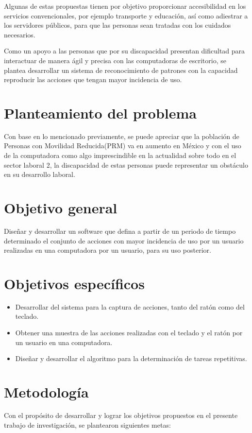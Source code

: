 
Algunas de estas propuestas tienen por objetivo proporcionar accesibilidad en
 los servicios convencionales, por ejemplo transporte y educación, así como
 adiestrar a los servidores públicos, para que las personas sean tratadas con
 los cuidados necesarios.
 
 
Como un apoyo a las personas que por su discapacidad presentan dificultad para
 interactuar de manera ágil y precisa con las computadoras de escritorio, se
 plantea desarrollar un sistema de reconocimiento de patrones con la capacidad
 reproducir las acciones que tengan mayor incidencia de uso.

\section{Planteamiento del problema}
Con base en lo mencionado previamente, se puede apreciar que la población de
 Personas con Movilidad Reducida(PRM) va en aumento en México y con el uso de
 la computadora como algo imprescindible en la actualidad sobre todo en el
 sector laboral 2, la discapacidad de estas personas puede representar un
 obstáculo en su desarrollo laboral.



\section{Objetivo general} 
Diseñar y desarrollar un software que defina a partir de un periodo de tiempo
 determinado el conjunto de acciones con mayor incidencia de uso por un usuario
 realizadas en una computadora por un usuario, para su uso posterior.

\section{Objetivos específicos}
\begin{itemize}
  \item Desarrollar del sistema para la captura de acciones, tanto del  ratón
  como del teclado.
  \item Obtener una muestra de las acciones realizadas con el teclado y el 
  ratón por un usuario en una computadora.
  \item Diseñar y desarrollar el algoritmo para la determinación de tareas
  repetitivas.
\end{itemize}


\section{Metodología}
Con el propósito de desarrollar y lograr los objetivos propuestos en el presente trabajo de investigación, se plantearon siguientes metas:
